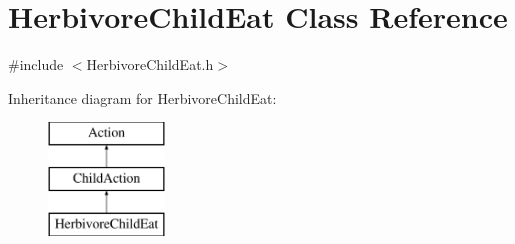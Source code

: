 \hypertarget{class_herbivore_child_eat}{}\section{Herbivore\+Child\+Eat Class Reference}
\label{class_herbivore_child_eat}


{\ttfamily \#include $<$Herbivore\+Child\+Eat.\+h$>$}

Inheritance diagram for Herbivore\+Child\+Eat\+:\begin{figure}[H]
\begin{center}
\leavevmode
\includegraphics[height=3.000000cm]{class_herbivore_child_eat}
\end{center}
\end{figure}

